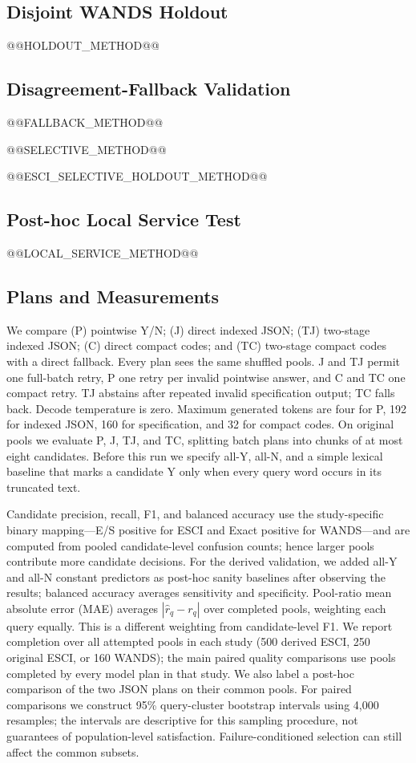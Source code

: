 \documentclass[conference]{IEEEtran}
\begin{document}
\subsection{Disjoint WANDS Holdout}
@@HOLDOUT_METHOD@@

\subsection{Disagreement-Fallback Validation}
@@FALLBACK_METHOD@@

@@SELECTIVE_METHOD@@

@@ESCI_SELECTIVE_HOLDOUT_METHOD@@

\subsection{Post-hoc Local Service Test}
@@LOCAL_SERVICE_METHOD@@

\subsection{Plans and Measurements}
We compare (P) pointwise Y/N; (J) direct indexed JSON; (TJ) two-stage indexed JSON; (C) direct compact codes; and (TC) two-stage compact codes with a direct fallback. Every plan sees the same shuffled pools. J and TJ permit one full-batch retry, P one retry per invalid pointwise answer, and C and TC one compact retry. TJ abstains after repeated invalid specification output; TC falls back. Decode temperature is zero. Maximum generated tokens are four for P, 192 for indexed JSON, 160 for specification, and 32 for compact codes. On original pools we evaluate P, J, TJ, and TC, splitting batch plans into chunks of at most eight candidates. Before this run we specify all-Y, all-N, and a simple lexical baseline that marks a candidate Y only when every query word occurs in its truncated text.

Candidate precision, recall, F1, and balanced accuracy use the study-specific binary mapping---E/S positive for ESCI and Exact positive for WANDS---and are computed from pooled candidate-level confusion counts; hence larger pools contribute more candidate decisions. For the derived validation, we added all-Y and all-N constant predictors as post-hoc sanity baselines after observing the results; balanced accuracy averages sensitivity and specificity. Pool-ratio mean absolute error (MAE) averages $|\hat r_q-r_q|$ over completed pools, weighting each query equally. This is a different weighting from candidate-level F1. We report completion over all attempted pools in each study (500 derived ESCI, 250 original ESCI, or 160 WANDS); the main paired quality comparisons use pools completed by every model plan in that study. We also label a post-hoc comparison of the two JSON plans on their common pools. For paired comparisons we construct 95\% query-cluster bootstrap intervals using 4,000 resamples; the intervals are descriptive for this sampling procedure, not guarantees of population-level satisfaction. Failure-conditioned selection can still affect the common subsets.
\end{document}
